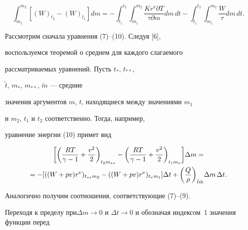 \begin{equation}


\int_{m_{1}}^{m_{2}}[(W)_{t_{2}}-(W)_{t_{1}}]dm = 


-\int_{t_{1}}^{t_{2}}\int_{m_{1}}^{m_{2}} \frac {Kr^{\nu}


{\partial T}}{\tau {\partial m}}dm\, dt -


\int_{t_{1}}^{t_{2}}\int_{m_{1}}^{m_{2}} \frac {W}{\tau}dm\,dt.


\end{equation}





Рассмотрим сначала уравнения (7)--(10). Следуя [6],


воспользуемся теоремой о среднем для каждого слагаемого


рассматриваемых уравнений. Пусть $t_{*}$, $ t_{**}$,


$\widetilde{t}$, $m_{*}$, $m_{**}$, $\widetilde{m}$ --- средние


значения аргументов $m$, $t$, находящиеся между значениями $m_{1}$


и $m_{2}$, $t_{1}$ и $t_{2}$ соответственно. Тогда, например,


уравнение энергии (10) примет вид


\begin{multline*}


\bigg[\bigg(\frac{RT}{\gamma-1}+ \frac


{{ v }^2}{2}\bigg)_{t_{2} m_{**}} - \bigg(\frac{RT}{\gamma-1}+ \frac


{{ v }^2}{2}\bigg)_{t_{1} m_{*}}\bigg]{\Delta} m =\\


%


=-[((W+p{ v })r^{\nu})_{t_{**}


m_{2}}-((W+p{ v })r^{\nu})_{t_{*} m_{1}}]{\Delta} t + \bigg(\frac


{Q}{\rho}\bigg)_{\Tilde{t} \Tilde{m}} {\Delta}m\,{\Delta}t.


\end{multline*}





Аналогично получим соотношения, соответствующие (7)--(9).


Переходя к пределу при\linebreak $\Delta m \rightarrow 0$ и $\Delta t


\rightarrow 0$ и обозначая индексом~1 значения функции перед


